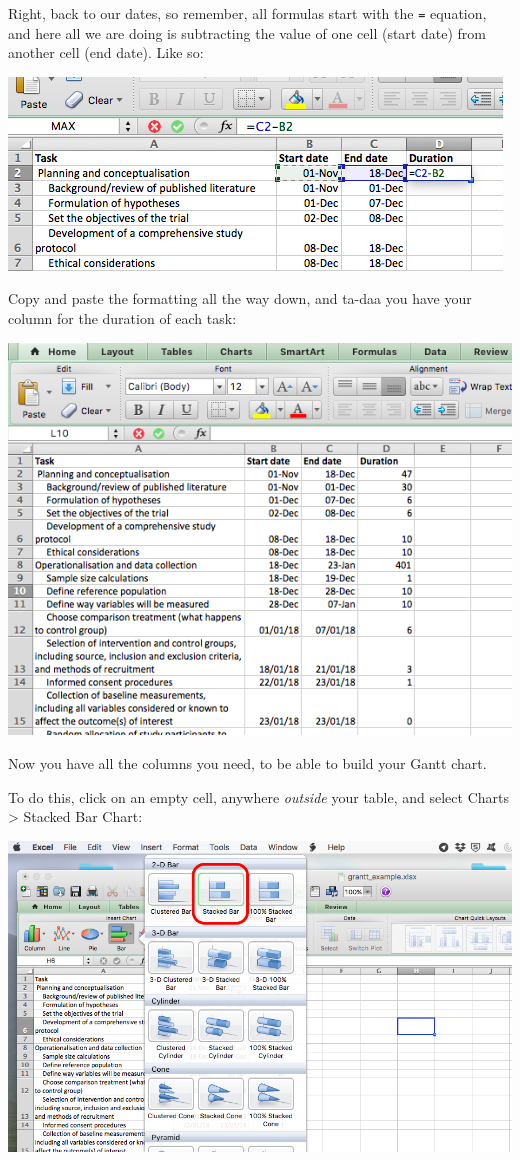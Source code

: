 \documentclass[]{book}
\theoremstyle{definition}
\theoremstyle{definition}
\theoremstyle{definition}
\theoremstyle{remark}
\begin{document}
Right, back to our dates, so remember, all formulas start with the
\texttt{=} equation, and here all we are doing is subtracting the value
of one cell (start date) from another cell (end date). Like so:

\includegraphics{imgs/calc_dur.png}

Copy and paste the formatting all the way down, and ta-daa you have your
column for the duration of each task:

\includegraphics{imgs/all_cols_gantt.png}

Now you have all the columns you need, to be able to build your Gantt
chart.

To do this, click on an empty cell, anywhere \emph{outside} your table,
and select Charts \textgreater{} Stacked Bar Chart:

\includegraphics{imgs/gantt_select_bar.png}
\end{document}
